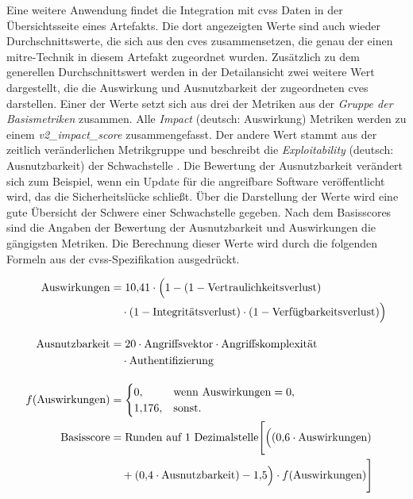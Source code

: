 \par Eine weitere Anwendung findet die Integration mit \gls{cvss} Daten in der Übersichtsseite eines Artefakts. Die dort angezeigten Werte sind auch wieder Durchschnittswerte, die sich aus den \glspl{cve} zusammensetzen, die genau der einen \gls{mitre}-Technik in diesem Artefakt zugeordnet wurden. Zusätzlich zu dem generellen Durchschnittswert werden in der Detailansicht zwei weitere Wert dargestellt, die die Auswirkung und Ausnutzbarkeit der zugeordneten \glspl{cve} darstellen. Einer der Werte setzt sich aus drei der Metriken aus der \textit{Gruppe der Basismetriken} zusammen. Alle \textit{Impact} (deutsch: Auswirkung) Metriken werden zu einem \textit{v2\_impact\_score} zusammengefasst. Der andere Wert stammt aus der zeitlich veränderlichen Metrikgruppe und beschreibt die \textit{Exploitability} (deutsch: Ausnutzbarkeit) der Schwachstelle \autocite{CVSSV2Complete}. Die Bewertung der Ausnutzbarkeit verändert sich zum Beispiel, wenn ein Update für die angreifbare Software veröffentlicht wird, das die Sicherheitslücke schließt.
Über die Darstellung der Werte wird eine gute Übersicht der Schwere einer Schwachstelle gegeben. Nach dem Basisscores sind die Angaben der Bewertung der Ausnutzbarkeit und Auswirkungen die gängigsten Metriken. Die Berechnung dieser Werte wird durch die folgenden Formeln aus der \gls{cvss}-Spezifikation ausgedrückt.

\begin{align*}
    \text{Auswirkungen}    & = 10{,}41 \cdot \Big( 1
    - (1 - \text{Vertraulichkeitsverlust}) \notag                                      \\
                           & \quad \cdot (1 - \text{Integritätsverlust})
    \cdot (1 - \text{Verfügbarkeitsverlust}) \Big) \notag                              \\[10pt]
    \text{Ausnutzbarkeit}  & = 20 \cdot \text{Angriffsvektor}
    \cdot \text{Angriffskomplexität} \notag                                            \\
                           & \quad \cdot \text{Authentifizierung} \notag               \\[10pt]
    f(\text{Auswirkungen}) & =
    \begin{cases}
        0,       & \text{wenn Auswirkungen} = 0, \\
        1{,}176, & \text{sonst.}
    \end{cases}                                           \\
    \text{Basisscore}      & = \text{Runden auf 1 Dezimalstelle} \Bigg[ \Big(
    (0{,}6 \cdot \text{Auswirkungen}) \notag                                           \\
                           & \quad + (0{,}4 \cdot \text{Ausnutzbarkeit}) - 1{,}5 \Big)
    \cdot f(\text{Auswirkungen}) \Bigg] \notag                                         \\[10pt]
\end{align*}

